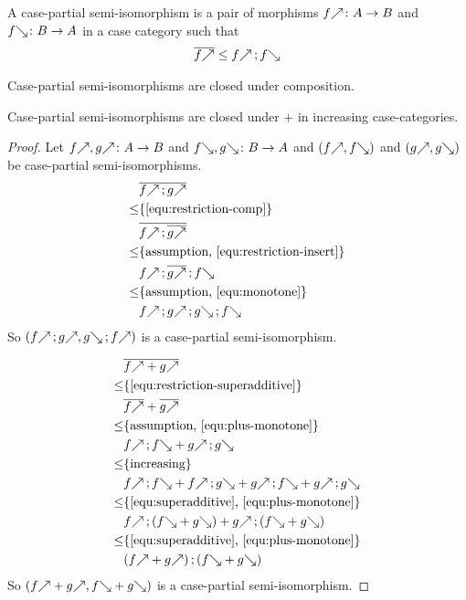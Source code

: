 \documentclass[runningheads,envcountsame]{llncs}
\begin{document}
\begin{definition}
    A case-partial semi-isomorphism is a pair of morphisms $\f{f}\colon A \to B$ and $\b{f}\colon B \to A$ in a case category such that
    \begin{gather}
        \overline{\f{f}} \leq \comp{\f{f}}{\b{f}}
    \end{gather}
\end{definition}
\begin{lemma}
    Case-partial semi-isomorphisms are closed under composition.

    Case-partial semi-isomorphisms are closed under $+$ in increasing case-cat\-egories.
\end{lemma}
\begin{proof}
    Let $\f{f}, \f{g}\colon A \to B$ and $\b{f}, \b{g}\colon B \to A$ and $(\f{f}, \b{f})$ and $(\f{g}, \b{g})$ be case-partial semi-isomorphisms.
    \begin{align}
         & \overline{\comp{\f{f}}{\f{g}}} \\
    \leq & \text{\{\Cref{equ:restriction-comp}\}} \\
         & \overline{\comp{\f{f}}{\overline{\f{g}}}} \\
    \leq & \text{\{assumption, \Cref{equ:restriction-insert}\}} \\
        & \comp{\f{f}}{\comp{\overline{\f{g}}}{\b{f}}} \\
    \leq & \text{\{assumption, \Cref{equ:monotone}\}} \\
        & \comp{\f{f}}{\comp{\comp{\f{g}}{\b{g}}}{\b{f}}}
    \end{align}
    So $(\comp{\f{f}}{\f{g}}, \comp{\b{g}}{\f{f}})$ is a case-partial semi-isomorphism.
    
    \begin{align}
         & \overline{\f{f} + \f{g}} \\
    \leq & \text{\{\Cref{equ:restriction-superadditive}\}}\\
         & \overline{\f{f}} + \overline{\f{g}} \\
    \leq & \text{\{assumption, \Cref{equ:plus-monotone}\}}\\
         & \comp{\f{f}}{\b{f}} + \comp{\f{g}}{\b{g}} \\
    \leq & \text{\{increasing\}}\\
         & \comp{\f{f}}{\b{f}} + \comp{\f{f}}{\b{g}} + \comp{\f{g}}{\b{f}} + \comp{\f{g}}{\b{g}} \\
    \leq & \text{\{\Cref{equ:superadditive}, \Cref{equ:plus-monotone}\}} \\
         & \comp{\f{f}}{(\b{f} + \b{g})} + \comp{\f{g}}{(\b{f} + \b{g})} \\
    \leq & \text{\{\Cref{equ:superadditive}, \Cref{equ:plus-monotone}\}} \\
         & \comp{(\f{f} + \f{g})}{(\b{f} + \b{g})}
    \end{align}
    So $(\f{f} + \f{g}, \b{f} + \b{g})$ is a case-partial semi-isomorphism.
\end{proof}
\end{document}
